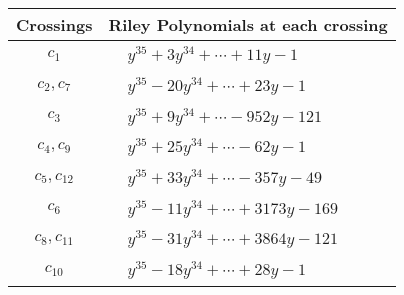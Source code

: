 \documentclass[1p]{elsarticle_modified}
\theoremstyle{definition}
\begin{document}
\begin{tabular}{m{50pt}|m{274pt}}
Crossings & \hspace{64pt}Riley Polynomials at each crossing \\
\hline $$\begin{aligned}c_{1}\end{aligned}$$&$\begin{aligned}
&y^{35}+3 y^{34}+\cdots+11 y-1
\end{aligned}$\\
\hline $$\begin{aligned}c_{2},c_{7}\end{aligned}$$&$\begin{aligned}
&y^{35}-20 y^{34}+\cdots+23 y-1
\end{aligned}$\\
\hline $$\begin{aligned}c_{3}\end{aligned}$$&$\begin{aligned}
&y^{35}+9 y^{34}+\cdots-952 y-121
\end{aligned}$\\
\hline $$\begin{aligned}c_{4},c_{9}\end{aligned}$$&$\begin{aligned}
&y^{35}+25 y^{34}+\cdots-62 y-1
\end{aligned}$\\
\hline $$\begin{aligned}c_{5},c_{12}\end{aligned}$$&$\begin{aligned}
&y^{35}+33 y^{34}+\cdots-357 y-49
\end{aligned}$\\
\hline $$\begin{aligned}c_{6}\end{aligned}$$&$\begin{aligned}
&y^{35}-11 y^{34}+\cdots+3173 y-169
\end{aligned}$\\
\hline $$\begin{aligned}c_{8},c_{11}\end{aligned}$$&$\begin{aligned}
&y^{35}-31 y^{34}+\cdots+3864 y-121
\end{aligned}$\\
\hline $$\begin{aligned}c_{10}\end{aligned}$$&$\begin{aligned}
&y^{35}-18 y^{34}+\cdots+28 y-1
\end{aligned}$\\
\hline
\end{tabular}\\~\\
\end{document}
